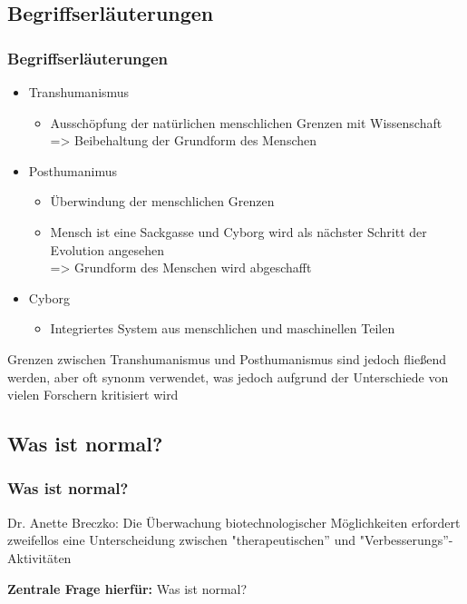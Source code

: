 \documentclass[aspectratio=169,16pt,xcolor=table]{beamer}
\begin{document}
\subsection{Begriffserläuterungen}
\begin{frame}
	\frametitle{Begriffserläuterungen}
	\begin{itemize}
	  \item Transhumanismus
    \begin{itemize}
      \item Ausschöpfung der natürlichen menschlichen Grenzen mit Wissenschaft~\cite{Merzlyakov2022}\\
      => Beibehaltung der Grundform des Menschen
    \end{itemize}
	\item Posthumanimus
    \begin{itemize}
      \item Überwindung der menschlichen Grenzen~\cite{Merzlyakov2022}\\
      \item Mensch ist eine Sackgasse und Cyborg wird als nächster Schritt der Evolution angesehen~\cite{Merzlyakov2022}\\
      => Grundform des Menschen wird abgeschafft
    \end{itemize}
    \item Cyborg
    \begin{itemize}
      \item Integriertes System aus menschlichen und maschinellen Teilen~\cite{warwick2000cyborg}
    \end{itemize}
	\end{itemize}
  \scriptsize Grenzen zwischen Transhumanismus und Posthumanismus sind jedoch fließend werden, aber oft synonm verwendet, was jedoch aufgrund der Unterschiede von vielen Forschern kritisiert wird~\cite{Merzlyakov2022}
\end{frame}

\subsection{Was ist normal?}
\begin{frame}
  \frametitle{Was ist normal?}
  Dr. Anette Breczko: Die Überwachung biotechnologischer Möglichkeiten erfordert zweifellos eine Unterscheidung zwischen "therapeutischen'' und "Verbesserungs''-Aktivitäten~\cite{breczko2021human}
  
  \vspace{12pt}
  \textbf{Zentrale Frage hierfür:} Was ist normal? 
\end{frame}
\end{document}
